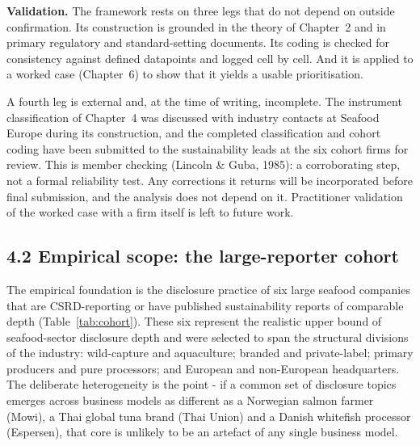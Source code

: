 \documentclass[
]{article}
\begin{document}
\textbf{Validation.}\label{framework-validation-strategy} The framework rests on
three legs that do not depend on outside confirmation. Its construction is grounded
in the theory of Chapter~2 and in primary regulatory and standard-setting documents.
Its coding is checked for consistency against defined datapoints and logged
cell by cell. And it is applied to a worked case (Chapter~6) to show that it
yields a usable prioritisation.

A fourth leg is external and, at the time of writing, incomplete. The instrument
classification of Chapter~4 was discussed with industry contacts at Seafood Europe
during its construction, and the completed classification and cohort coding have
been submitted to the sustainability leads at the six cohort firms for review. This
is member checking (Lincoln \& Guba, 1985): a corroborating step, not a formal
reliability test. Any corrections it returns will be incorporated before final
submission, and the analysis does not depend on it. Practitioner validation of the
worked case with a firm itself is left to future work.


\iffalse %
\subsection{4.2 Empirical scope: the large-reporter
cohort}\label{empirical-scope-the-large-reporter-cohort}

The empirical foundation is the disclosure practice of six large
seafood companies that are CSRD-reporting or have published
sustainability reports of comparable depth (Table~\ref{tab:cohort}).
These six represent the realistic upper bound of seafood-sector
disclosure depth and were selected to span the structural divisions of
the industry: wild-capture and aquaculture; branded and private-label;
primary producers and pure processors; and European and non-European
headquarters. The deliberate heterogeneity is the point - if a common
set of disclosure topics emerges across business models as different as a
Norwegian salmon farmer (Mowi), a Thai global tuna brand (Thai Union) and
a Danish whitefish processor (Espersen), that core is unlikely to be an
artefact of any single business model.
\end{document}
